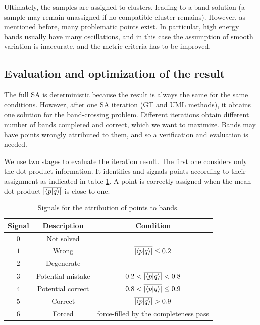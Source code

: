 \documentclass[a4paper,12pt]{report}
\begin{document}
\begin{appendices}
Ultimately, the samples are assigned to clusters, leading to a band solution (a sample may remain unassigned if no compatible cluster remains).
However, as mentioned before, many problematic points exist.
In particular, high energy bands usually have many oscillations, and in this case the assumption of smooth variation is inaccurate, and the metric criteria has to be improved.





\subsection{Evaluation and optimization of the result}
The full SA is deterministic because the result is always the same for the same conditions. However, after one SA iteration (GT and UML methods), it obtains one solution for the band-crossing problem.
Different iterations obtain different number of bands completed and correct, which we want to maximize.
Bands may have points wrongly attributed to them, and so a verification and evaluation is needed.

We use two stages to evaluate the iteration result.
The first one considers only the dot-product information.
It identifies and signals points according to their assignment as indicated in table \ref{tab:signals1}.
A point is correctly assigned when the mean dot-product $\overline{\left|\braket{p}{q}\right|}$ is close to one.

\begin{table}[H]
    \center
    \caption{Signals for the attribution of points to bands.}\label{tab:signals1}
    \begin{tabular}{ccc}
        \hline
        Signal & Description       & Condition                                  \\\hline
        $0$    & Not solved        &                                            \\
        $1$    & Wrong             & $\overline{\left|\braket{p}{q}\right|} \leq 0.2$        \\
        $2$    & Degenerate        &                                            \\
        $3$    & Potential mistake & $0.2 < \overline{\left|\braket{p}{q}\right|} < 0.8$  \\
        $4$    & Potential correct & $0.8 < \overline{\left|\braket{p}{q}\right|} \leq 0.9 $ \\
        $5$    & Correct           & $\overline{\left|\braket{p}{q}\right|} > 0.9$           \\
        $6$    & Forced            & force-filled by the completeness pass                   \\\hline
    \end{tabular}
\end{table}


\end{appendices}
\end{document}
